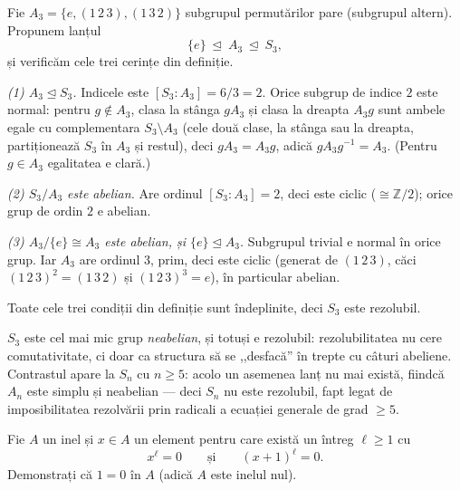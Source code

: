 \begin{solutie}
Fie $A_{3}=\{e,(1\,2\,3),(1\,3\,2)\}$ subgrupul permutărilor pare
(subgrupul altern). Propunem lanțul
\[
  \{e\}\ \trianglelefteq\ A_{3}\ \trianglelefteq\ S_{3},
\]
și verificăm cele trei cerințe din definiție.

\smallskip
\textit{(1) $A_{3}\trianglelefteq S_{3}$.} Indicele este
$[S_{3}:A_{3}]=6/3=2$. Orice subgrup de indice $2$ este normal: pentru
$g\notin A_{3}$, clasa la stânga $gA_{3}$ și clasa la dreapta
$A_{3}g$ sunt ambele egale cu complementara $S_{3}\setminus A_{3}$ (cele
două clase, la stânga sau la dreapta, partiționează $S_{3}$
în $A_{3}$ și restul), deci $gA_{3}=A_{3}g$, adică
$gA_{3}g^{-1}=A_{3}$. (Pentru $g\in A_{3}$ egalitatea e clară.)

\smallskip
\textit{(2) $S_{3}/A_{3}$ este abelian.} Are ordinul $[S_{3}:A_{3}]=2$, deci
este ciclic ($\cong\mathbb{Z}/2$); orice grup de ordin $2$ e abelian.

\smallskip
\textit{(3) $A_{3}/\{e\}\cong A_{3}$ este abelian, și
$\{e\}\trianglelefteq A_{3}$.} Subgrupul trivial e normal în orice grup.
Iar $A_{3}$ are ordinul $3$, prim, deci este ciclic (generat de $(1\,2\,3)$,
căci $(1\,2\,3)^{2}=(1\,3\,2)$ și $(1\,2\,3)^{3}=e$), în
particular abelian.

Toate cele trei condiții din definiție sunt îndeplinite, deci
$S_{3}$ este rezolubil.
\end{solutie}

\begin{obs}
$S_{3}$ este cel mai mic grup \emph{neabelian}, și totuși e
rezolubil: rezolubilitatea nu cere comutativitate, ci doar ca structura
să se ,,desfacă'' în trepte cu câturi abeliene. Contrastul
apare la $S_{n}$ cu $n\ge 5$: acolo un asemenea lanț nu mai există,
fiindcă $A_{n}$ este simplu și neabelian --- deci $S_{n}$ nu este
rezolubil, fapt legat de imposibilitatea rezolvării prin radicali a
ecuației generale de grad $\ge 5$.
\end{obs}

\begin{problema}
Fie $A$ un inel și $x\in A$ un element pentru care există un
întreg $\ell\ge 1$ cu
\[
  x^{\ell}=0\qquad\text{și}\qquad (x+1)^{\ell}=0 .
\]
Demonstrați că $1=0$ în $A$ (adică $A$ este inelul nul).
\end{problema}


